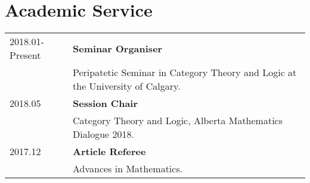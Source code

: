 \documentclass[10pt]{article}
\begin{document}
\section*{Academic Service}
\begin{tabu}{X[1]X[5]}
    2018.01-Present & \bf{Seminar Organiser}\\
{}& Peripatetic Seminar in Category Theory and Logic at the University of Calgary.\\

    2018.05 & \bf{Session Chair}\\
{}& Category Theory and Logic, Alberta Mathematics Dialogue 2018.\\

    2017.12 & \bf{Article Referee}\\
{}& Advances in Mathematics.\\

\end{tabu}
\end{document}
